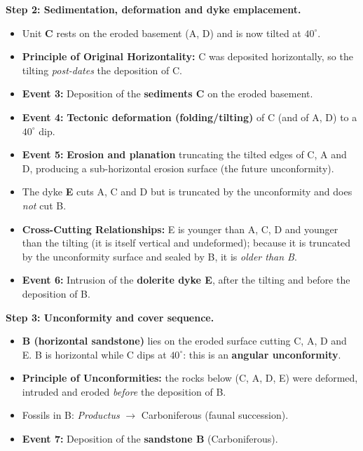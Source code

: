\documentclass[11pt]{article}
\begin{document}
\begin{exoresolu}
\textbf{Step 2: Sedimentation, deformation and dyke emplacement.}
\begin{itemize}
    \item Unit \textbf{C} rests on the eroded basement (A, D) and is now tilted at $40^\circ$.
    \item \textbf{Principle of Original Horizontality:} C was deposited horizontally, so the tilting \emph{post-dates} the deposition of C.
    \item \textbf{Event 3:} Deposition of the \textbf{sediments C} on the eroded basement.
    \item \textbf{Event 4:} \textbf{Tectonic deformation (folding/tilting)} of C (and of A, D) to a $40^\circ$ dip.
    \item \textbf{Event 5:} \textbf{Erosion and planation} truncating the tilted edges of C, A and D, producing a sub-horizontal erosion surface (the future unconformity).
    \item The dyke \textbf{E} cuts A, C and D but is truncated by the unconformity and does \emph{not} cut B.
    \item \textbf{Cross-Cutting Relationships:} E is younger than A, C, D and younger than the tilting (it is itself vertical and undeformed); because it is truncated by the unconformity surface and sealed by B, it is \emph{older than B}.
    \item \textbf{Event 6:} Intrusion of the \textbf{dolerite dyke E}, after the tilting and before the deposition of B.
\end{itemize}

\textbf{Step 3: Unconformity and cover sequence.}
\begin{itemize}
    \item \textbf{B (horizontal sandstone)} lies on the eroded surface cutting C, A, D and E. B is horizontal while C dips at $40^\circ$: this is an \textbf{angular unconformity}.
    \item \textbf{Principle of Unconformities:} the rocks below (C, A, D, E) were deformed, intruded and eroded \emph{before} the deposition of B.
    \item Fossils in B: \emph{Productus} $\rightarrow$ Carboniferous (faunal succession).
    \item \textbf{Event 7:} Deposition of the \textbf{sandstone B} (Carboniferous).
\end{itemize}


\end{exoresolu}
\end{document}
